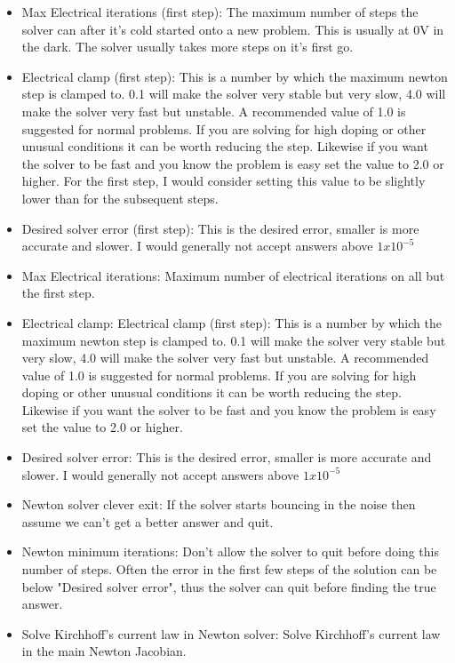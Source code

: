\begin{itemize}
  \item Max Electrical iterations (first step): The maximum number of steps the solver can after it's cold started onto a new problem.  This is usually at 0V in the dark.  The solver usually takes more steps on it's first go.
  \item Electrical clamp (first step): This is a number by which the maximum newton step is clamped to.  0.1 will make the solver very stable but very slow, 4.0 will make the solver very fast but unstable.  A recommended value of 1.0 is suggested for normal problems.  If you are solving for high doping or other unusual conditions it can be worth reducing the step.  Likewise if you want the solver to be fast and you know the problem is easy set the value to 2.0 or higher. For the first step, I would consider setting this value to be slightly lower than for the subsequent steps.
  \item Desired solver error (first step): This is the desired error, smaller is more accurate and slower. I would generally not accept answers above $1x10^{-5}$

  \item Max Electrical iterations: Maximum number of electrical iterations on all but the first step.
  \item Electrical clamp: Electrical clamp (first step): This is a number by which the maximum newton step is clamped to.  0.1 will make the solver very stable but very slow, 4.0 will make the solver very fast but unstable.  A recommended value of 1.0 is suggested for normal problems.  If you are solving for high doping or other unusual conditions it can be worth reducing the step.  Likewise if you want the solver to be fast and you know the problem is easy set the value to 2.0 or higher.
  \item Desired solver error: This is the desired error, smaller is more accurate and slower. I would generally not accept answers above $1x10^{-5}$

  \item Newton solver clever exit: If the solver starts bouncing in the noise then assume we can't get a better answer and quit.
  \item Newton minimum iterations: Don't allow the solver to quit before doing this number of steps.  Often the error in the first few steps of the solution can be below "Desired solver error", thus the solver can quit before finding the true answer.
  \item Solve Kirchhoff's current law in Newton solver: Solve Kirchhoff's current law in the main Newton Jacobian.


\end{itemize}
